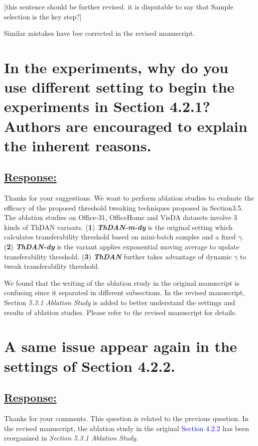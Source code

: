 \textcolor[rgb]{1.00,0.00,0.00}{[this sentence should be further revised. it is disputable to say that Sample selection is the key step?]}

Similar mistakes have bee corrected in the revised manuscript.


\section{In the experiments, why do you use different setting to begin the experiments in Section 4.2.1? Authors are encouraged to explain the inherent reasons.}
\subsection*{\underline{\textbf{Response:}}}

Thanks for your suggestions.
We want to perform ablation studies to evaluate the efficacy of the proposed threshold tweaking techniques proposed in Section3.5.
The ablation studies on Office-31, OfficeHome and VisDA datasets involve 3 kinds of ThDAN variants.
(\textbf{1}) \textit{\textbf{ThDAN-m-dy}} is the original setting which calculates transferability threshold based on mini-batch samples and a fixed $\gamma$.
(\textbf{2}) \textit{\textbf{ThDAN-dy}} is the variant applies exponential moving average to update transferability threshold.
(\textbf{3}) \textit{\textbf{ThDAN}} further takes advantage of dynamic $\gamma$ to tweak transferability threshold.

We found that the writing of the ablation study in the original manuscript is confusing since it separated in different subsections.
In the revised manuscript, Section \textit{5.3.1 Ablation Study} is added to better understand the settings and results of ablation studies.
Please refer to the revised manuscript for details.


\section{A same issue appear again in the settings of Section 4.2.2.}
\subsection*{\underline{\textbf{Response:}}}

Thanks for your comments.
This question is related to the previous question.
In the revised manuscript, the ablation study in the original \textcolor{blue}{Section 4.2.2} has been reorganized in \textit{Section 5.3.1 Ablation Study}.


